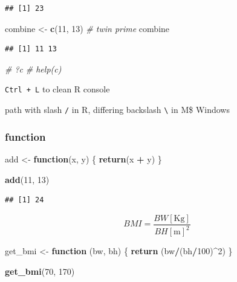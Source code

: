 \documentclass[
]{book}
\newenvironment{Shaded}{\begin{snugshade}}{\end{snugshade}}
\newcommand{\CommentTok}[1]{\textcolor[rgb]{0.56,0.35,0.01}{\textit{#1}}}
\newcommand{\ControlFlowTok}[1]{\textcolor[rgb]{0.13,0.29,0.53}{\textbf{#1}}}
\newcommand{\DecValTok}[1]{\textcolor[rgb]{0.00,0.00,0.81}{#1}}
\newcommand{\FunctionTok}[1]{\textcolor[rgb]{0.13,0.29,0.53}{\textbf{#1}}}
\newcommand{\NormalTok}[1]{#1}
\newcommand{\OtherTok}[1]{\textcolor[rgb]{0.56,0.35,0.01}{#1}}
\newcommand{\SpecialCharTok}[1]{\textcolor[rgb]{0.81,0.36,0.00}{\textbf{#1}}}
\theoremstyle{definition}
\theoremstyle{definition}
\theoremstyle{definition}
\theoremstyle{definition}
\theoremstyle{remark}
\begin{document}
\begin{verbatim}
## [1] 23
\end{verbatim}

\begin{Shaded}
\begin{Highlighting}[]
\NormalTok{combine }\OtherTok{\textless{}{-}} \FunctionTok{c}\NormalTok{(}\DecValTok{11}\NormalTok{, }\DecValTok{13}\NormalTok{) }\CommentTok{\# twin prime}
\NormalTok{combine}
\end{Highlighting}
\end{Shaded}

\begin{verbatim}
## [1] 11 13
\end{verbatim}

\begin{Shaded}
\begin{Highlighting}[]
\CommentTok{\# ?c}
\CommentTok{\# help(c)}
\end{Highlighting}
\end{Shaded}

\texttt{Ctrl\ +\ L} to clean R console

path with slash \texttt{/} in R, differing backslash \texttt{\textbackslash{}} in M\$ Windows

\hypertarget{function}{%
\subsubsection{function}\label{function}}

\begin{Shaded}
\begin{Highlighting}[]
\NormalTok{add }\OtherTok{\textless{}{-}} \ControlFlowTok{function}\NormalTok{(x, y) \{}
  \FunctionTok{return}\NormalTok{(x }\SpecialCharTok{+}\NormalTok{ y)}
\NormalTok{\}}

\FunctionTok{add}\NormalTok{(}\DecValTok{11}\NormalTok{, }\DecValTok{13}\NormalTok{)}
\end{Highlighting}
\end{Shaded}

\begin{verbatim}
## [1] 24
\end{verbatim}

\[
BMI = \dfrac{BW\left[\text{Kg}\right]}{{BH\left[\text{m}\right]}^2}
\]

\begin{Shaded}
\begin{Highlighting}[]
\NormalTok{get\_bmi }\OtherTok{\textless{}{-}} \ControlFlowTok{function}\NormalTok{ (bw, bh) \{}
  \FunctionTok{return}\NormalTok{ (bw}\SpecialCharTok{/}\NormalTok{(bh}\SpecialCharTok{/}\DecValTok{100}\NormalTok{)}\SpecialCharTok{\^{}}\DecValTok{2}\NormalTok{)}
\NormalTok{\}}

\FunctionTok{get\_bmi}\NormalTok{(}\DecValTok{70}\NormalTok{, }\DecValTok{170}\NormalTok{)}
\end{Highlighting}
\end{Shaded}
\end{document}
